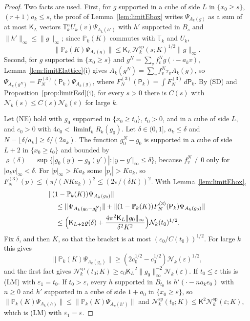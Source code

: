 \documentclass[aps,prd,twocolumn,superscriptaddress,nofootinbib,longbibliography,floatfix,amsmath,amssymb,10pt]{revtex4-2}
\theoremstyle{definition}
\theoremstyle{remark}
\begin{document}
\begin{proof}
Two facts are used. First, for $g$ supported in a cube of side $L$ in
$\{x_0\ge s\}$, $(r+1)a_k\le s$, the proof of Lemma~\ref{lem:limitEbox}
writes $\Psi_{A_k(g)}$ as a sum of at most $\mathsf K_L$ vectors $\mathbb
T_k^nU_k(v)\Psi_{A_k(h')}$ with $h'$ supported in $B_s$ and $\|h'\|_\infty
\le\|g\|_\infty$; since $\mathbb P_k(K)$ commutes with $\mathbb T_k$ and
$U_k$,
\[
\|\mathbb P_k(K)\Psi_{A_k(g)}\|\le\mathsf K_L\,\mathcal N^{\mathrm{sp}}_k
(s;K)^{1/2}\|g\|_\infty .
\]
Second, for $g$ supported in $\{x_0\ge s\}$ and $g^N=\sum_vf^N_vg(\cdot-
a_kv)$, Lemma~\ref{lem:limitElattice}(i) gives $A_k(g^N)=\sum_vf^N_v\tau_v
A_k(g)$, so $\Psi_{A_k(g^N)}=F^{(3)}_N(\mathsf P_k)\Psi_{A_k(g)}$, where
$F^{(3)}_N(\mathsf P_k)=\int F^{(3)}_N\,d\mathsf P_k$. By (SD) and
Proposition~\ref{prop:limitEsd}(i), for every $s>0$ there is $C(s)$ with
$\mathcal N_k(s)\le C(s)\mathcal N_k(\varepsilon)$ for large $k$.

Let (NE) hold with $g_0$ supported in $\{x_0\ge t_0\}$, $t_0>0$, and in a
cube of side $L$, and $c_0>0$ with $4c_0<\liminf_kR_k(g_0)$. Let $\delta\in(0,1]$,
$a_k\le\delta$ and $N=\lfloor\delta/a_k\rfloor\ge\delta/(2a_k)$. The
function $g_0^N-g_0$ is supported in a cube of side $L+2$ in $\{x_0\ge t_0\}$
and bounded by $\varrho(\delta)=\sup\{|g_0(y)-g_0(y')|:|y-y'|_\infty\le
\delta\}$, because $f^N_v\ne0$ only for $|a_kv|_\infty<\delta$. For
$|p|_\infty>Ka_k$ some $|p_i|>Ka_k$, so $F^{(3)}_N(p)\le(\pi/(NKa_k))^2\le
(2\pi/(\delta K))^2$. With Lemma~\ref{lem:limitEbox},
\[
\begin{split}
&\|(1-\mathbb P_k(K))\Psi_{A_k(g_0)}\|\\
&\quad\le\|\Psi_{A_k(g_0-g_0^N)}\|+
\|(1-\mathbb P_k(K))F^{(3)}_N(\mathsf P_k)\Psi_{A_k(g_0)}\|\\
&\quad\le\Bigl(\mathsf K_{L+2}\varrho(\delta)+\frac{4\pi^2\mathsf K_L
\|g_0\|_\infty}{\delta^2K^2}\Bigr)\mathcal N_k(t_0)^{1/2} .
\end{split}
\]
Fix $\delta$, and then $K$, so that the bracket is at most
$(c_0/C(t_0))^{1/2}$. For large $k$ this gives
\[
\|\mathbb P_k(K)\Psi_{A_k(g_0)}\|\ge(2c_0^{1/2}-c_0^{1/2})\mathcal
N_k(\varepsilon)^{1/2},
\]
and the first fact
gives $\mathcal N^{\mathrm{sp}}_k(t_0;K)\ge c_0\mathsf K_L^{-2}\|g_0\|
_\infty^{-2}\mathcal N_k(\varepsilon)$. If $t_0\le\varepsilon$ this is (LM)
with $\varepsilon_1=t_0$. If $t_0>\varepsilon$, every $h$ supported in
$B_{t_0}$ is $h'(\cdot-na_ke_0)$ with $n\ge0$ and $h'$ supported in a cube of
side $1+a_0$ in $\{x_0\ge\varepsilon\}$, so $\|\mathbb P_k(K)\Psi_{A_k(h)}\|
\le\|\mathbb P_k(K)\Psi_{A_k(h')}\|$ and $\mathcal N^{\mathrm{sp}}_k(t_0;K)
\le\mathsf K^2\mathcal N^{\mathrm{sp}}_k(\varepsilon;K)$, which is (LM) with
$\varepsilon_1=\varepsilon$.


\end{proof}
\end{document}
